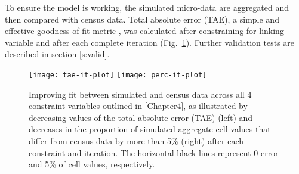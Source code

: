 % 
To ensure the model is working, the simulated micro-data are
aggregated and then compared with census data. Total absolute error (TAE), a
simple and effective goodness-of-fit metric \citep{Williamson1998, Voas2001}, was
calculated after constraining for linking variable and after each complete
iteration (Fig.~\ref{f:fit-plot}). Further validation tests are described in
section \ref{s:valid}.

\begin{figure}
\texttt{[image: tae-it-plot]}
\texttt{[image: perc-it-plot]}
\caption[Fit between simulated and census data]
{Improving fit between simulated and census data across all 4 constraint
variables outlined in \cref{Chapter4}, as illustrated by decreasing values of
the total absolute error (TAE) (left) and decreases in the proportion of
simulated aggregate cell values that differ from census data by more than 5\%
(right) after each constraint and iteration. The horizontal black lines
represent 0 error and 5\% of cell values, respectively. }
\label{f:fit-plot}
\end{figure}


